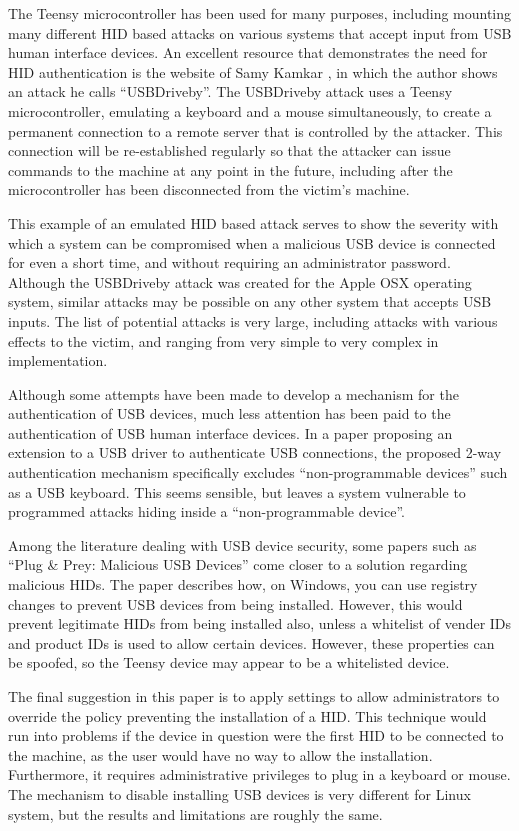 \documentclass{ieee}
\begin{document}
The Teensy microcontroller has been used for many purposes, including mounting many different HID based attacks on various systems that accept input from USB human interface devices. An excellent resource that demonstrates the need for HID authentication is the website of Samy Kamkar \cite{samy}, in which the author shows an attack he calls ``USBDriveby''. The USBDriveby attack uses a Teensy microcontroller, emulating a keyboard and a mouse simultaneously,  to create a permanent connection to a remote server that is controlled by the attacker.  This connection will be re-established regularly so that the attacker can issue commands to the machine at any point in the future, including after the microcontroller has been disconnected from the victim’s machine.

This example of an emulated HID based attack serves to show the severity with which a system can be compromised when a malicious USB device is connected for even a short time, and without requiring an administrator password. Although the USBDriveby attack was created for the Apple OSX operating system, similar attacks may be possible on any other system that accepts USB inputs. The list of potential attacks is very large, including attacks with various effects to the victim, and ranging from very simple to very complex in implementation.

Although some attempts have been made to develop a mechanism for the authentication of USB devices, much less attention has been paid to the authentication of USB human interface devices. In a paper \cite{wang} proposing an extension to a USB driver to authenticate USB connections, the proposed 2-way authentication mechanism specifically excludes ``non-programmable devices'' such as a USB keyboard. This seems sensible, but leaves a system vulnerable to programmed attacks hiding inside a ``non-programmable device''.

Among the literature dealing with USB device security, some papers such as ``Plug \& Prey: Malicious USB Devices'' come closer to a solution regarding malicious HIDs. The paper describes how, on Windows, you can use registry changes to prevent USB devices from being installed. However, this would prevent legitimate HIDs from being installed also, unless a whitelist of vender IDs and product IDs is used to allow certain devices. However, these properties can be spoofed, so the Teensy device may appear to be a whitelisted device.

The final suggestion in this paper is to apply settings to allow administrators to override the policy preventing the installation of a HID. This technique would run into problems if the device in question were the first HID to be connected to the machine, as the user would have no way to allow the installation. Furthermore, it requires administrative privileges to plug in a keyboard or mouse. The mechanism to disable installing USB devices is very different for Linux system, but the results and limitations are roughly the same.
\end{document}
